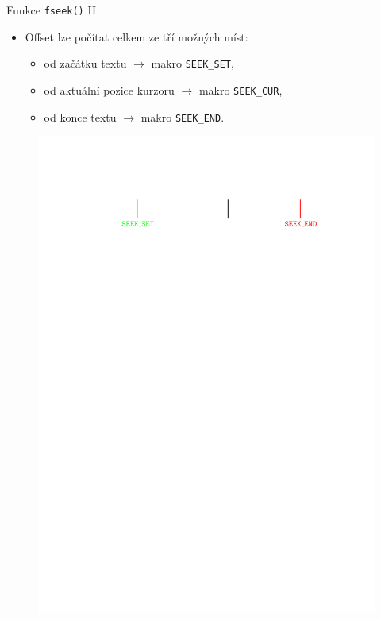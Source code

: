 \documentclass[14pt,aspectratio=169]{beamer}
\begin{document}
    \begin{frame}[t]{Funkce \texttt{fseek()} \textrm{II}}
        \begin{itemize}
            \item Offset lze počítat celkem ze tří možných míst:
            \begin{itemize}
                \item od začátku textu $\rightarrow$ makro \texttt{SEEK\_SET},
                \item od aktuální pozice kurzoru $\rightarrow$ makro \texttt{SEEK\_CUR},
                \item od konce textu $\rightarrow$ makro \texttt{SEEK\_END}.
            \end{itemize}
        \end{itemize}
        \begin{figure}
            \centering
            \includegraphics[scale=1]{images/cursor_fseek_cur_set_end.pdf}
        \end{figure}
    \end{frame}
\end{document}
